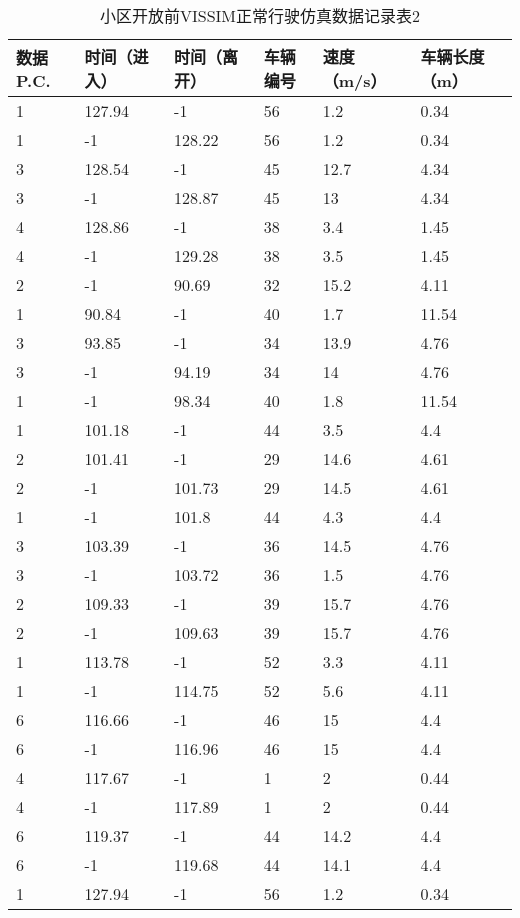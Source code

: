 \begin{table*}[h!]
  \centering
  \small
  \caption{小区开放前VISSIM正常行驶仿真数据记录表2}
\begin{tabular*}{\linewidth}{p{50pt}<{\centering}p{50pt}<{\centering}
p{60pt}<{\centering}p{60pt}<{\centering}p{60pt}<{\centering}p{70pt}<{\centering}}
\toprule
 数据P.C. & 时间（进入） & 时间（离开） & 车辆编号& 速度（m/s） & 车辆长度（m） \\
\midrule
1 & 127.94 & -1 & 56 & 1.2 & 0.34 \\
1 & -1 & 128.22 & 56 & 1.2 & 0.34 \\
3 & 128.54 & -1 & 45 & 12.7 & 4.34 \\
3 & -1 & 128.87 & 45 & 13 & 4.34 \\
4 & 128.86 & -1 & 38 & 3.4 & 1.45 \\
4 & -1 & 129.28 & 38 & 3.5 & 1.45 \\
2 & -1 & 90.69 & 32 & 15.2 & 4.11 \\
1 & 90.84 & -1 & 40 & 1.7 & 11.54 \\
3 & 93.85 & -1 & 34 & 13.9 & 4.76 \\
3 & -1 & 94.19 & 34 & 14 & 4.76 \\
1 & -1 & 98.34 & 40 & 1.8 & 11.54 \\
1 & 101.18 & -1 & 44 & 3.5 & 4.4 \\
2 & 101.41 & -1 & 29 & 14.6 & 4.61 \\
2 & -1 & 101.73 & 29 & 14.5 & 4.61 \\
1 & -1 & 101.8 & 44 & 4.3 & 4.4 \\
3 & 103.39 & -1 & 36 & 14.5 & 4.76 \\
3 & -1 & 103.72 & 36 & 1.5 & 4.76 \\
2 & 109.33 & -1 & 39 & 15.7 & 4.76 \\
2 & -1 & 109.63 & 39 & 15.7 & 4.76 \\
1 & 113.78 & -1 & 52 & 3.3 & 4.11 \\
1 & -1 & 114.75 & 52 & 5.6 & 4.11 \\
6 & 116.66 & -1 & 46 & 15 & 4.4 \\
6 & -1 & 116.96 & 46 & 15 & 4.4 \\
4 & 117.67 & -1 & 1 & 2 & 0.44 \\
4 & -1 & 117.89 & 1 & 2 & 0.44 \\
6 & 119.37 & -1 & 44 & 14.2 & 4.4 \\
6 & -1 & 119.68 & 44 & 14.1 & 4.4 \\
1 & 127.94 & -1 & 56 & 1.2 & 0.34 \\

\end{tabular*}
\end{table*}
